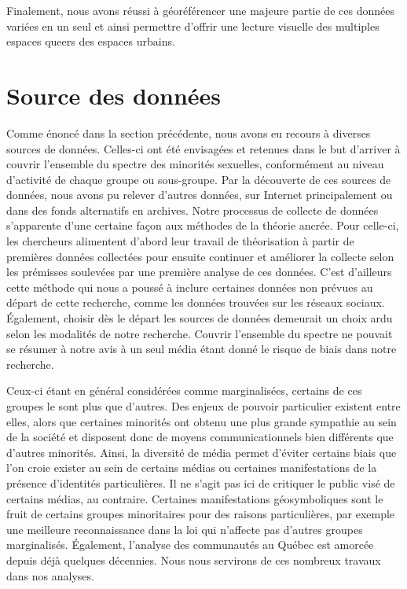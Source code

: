 Finalement, nous avons réussi à géoréférencer une majeure partie de ces données variées en un seul \sig{} et ainsi permettre d'offrir une lecture visuelle des multiples espaces queers des espaces urbains.

\section{Source des données}
\label{sec:source_des_donn_es}
Comme énoncé dans la section précédente, nous avons eu recours à diverses sources de données. 
Celles-ci ont été envisagées et retenues dans le but d'arriver à couvrir l'ensemble du spectre des minorités sexuelles, conformément au niveau d'activité de chaque groupe ou sous-groupe. 
Par la découverte de ces sources de données, nous avons pu relever d'autres données, sur Internet principalement ou dans des fonds alternatifs en archives. 
Notre processus de collecte de données s'apparente d'une certaine façon aux méthodes de la théorie ancrée.
Pour celle-ci, les chercheurs alimentent d'abord leur travail de théorisation à partir de premières données collectées pour ensuite continuer et améliorer la collecte selon les prémisses soulevées par une première analyse de ces données. 
C'est d'ailleurs cette méthode qui nous a poussé à inclure certaines données non prévues au départ de cette recherche, comme les données trouvées sur les réseaux sociaux. 
Également, choisir dès le départ les sources de données demeurait un choix ardu selon les modalités de notre recherche. 
Couvrir l'ensemble du spectre \lgbt{} ne pouvait se résumer à notre avis à un seul média étant donné le risque de biais dans notre recherche.

Ceux-ci étant en général considérées comme marginalisées, certains de ces groupes le sont plus que d'autres. 
Des enjeux de pouvoir particulier existent entre elles, alors que certaines minorités ont obtenu une plus grande sympathie au sein de la société et disposent donc de moyens communicationnels bien différents que d'autres minorités. 
Ainsi, la diversité de média permet d'éviter certains biais que l'on croie exister au sein de certains médias ou certaines manifestations de la présence d'identités particulières. 
Il ne s'agit pas ici de critiquer le public visé de certains médias, au contraire. 
Certaines manifestations géosymboliques sont le fruit de certains groupes minoritaires pour des raisons particulières, par exemple une meilleure reconnaissance dans la loi qui n'affecte pas d'autres groupes marginalisés. 
Également, l'analyse des communautés \lgbt{} au Québec est amorcée depuis déjà quelques décennies. 
Nous nous servirons de ces nombreux travaux dans nos analyses.

